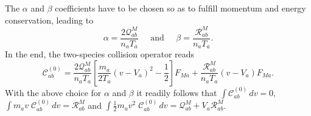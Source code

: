 \documentclass[11pt]{article}
\begin{document}
%
The $\alpha$ and $\beta$ coefficients have to be chosen so as to fulfill momentum and energy conservation, leading to
%
\begin{equation*}
\alpha = \frac{2\mathcal{Q}_{ab}^M}{n_aT_a}
\;\;\;\;\; \textrm{and} \;\;\;\;\;
\beta = \frac{\mathcal{R}_{ab}^M}{n_aT_a}.
\end{equation*} 
%
In the end, the two-species collision operator reads
%
\begin{equation}  \label{eq:CollOp_ab}
\mathcal{C}_{ab}^{(0)} = 
\frac{2\mathcal{Q}_{ab}^M}{n_aT_a} \left[ \frac{m_a}{2T_a}(v-V_a)^2 - \frac{1}{2}\right] F_{Ma} 
+ \frac{\mathcal{R}_{ab}^M}{n_aT_a} (v-V_a) F_{Ma}.
\end{equation} 
%
With the above choice for $\alpha$ and $\beta$ it readily follows that $\int \mathcal{C}_{ab}^{(0)} \,d v=0$, $\int m_a v\; \mathcal{C}_{ab}^{(0)} \,d v = \mathcal{R}_{ab}^M$ and $\int \frac{1}{2} m_a v^2\; \mathcal{C}_{ab}^{(0)} \,d v = \mathcal{Q}_{ab}^M + V_a\mathcal{R}_{ab}^M$.
\end{document}
